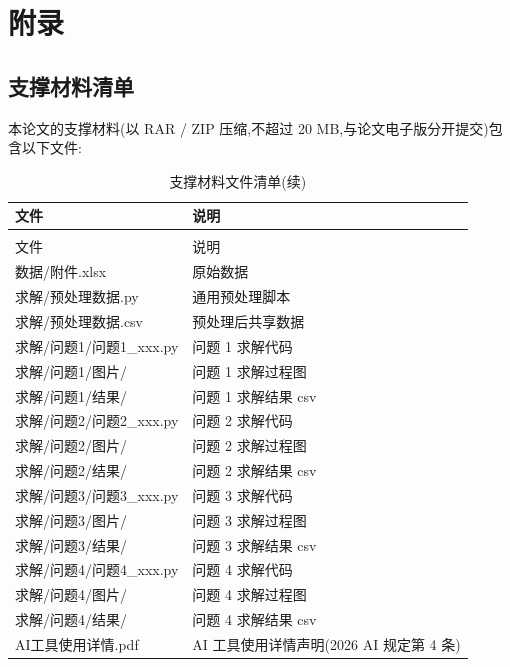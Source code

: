 
\section*{附录}

\subsection*{支撑材料清单}

本论文的支撑材料(以 RAR / ZIP 压缩,不超过 20 MB,与论文电子版分开提交)包含以下文件:

\begin{longtable}{>{\centering\arraybackslash}p{}>{\centering\arraybackslash}p{}}
  \caption{支撑材料文件清单}\\
  \toprule
  文件 & 说明 \\
  \midrule
  \endfirsthead
  \caption{支撑材料文件清单(续)}\\
  \toprule
  文件 & 说明 \\
  \midrule
  \endhead
  \bottomrule
  \endfoot
  数据/附件.xlsx & 原始数据 \\
  求解/预处理数据.py & 通用预处理脚本 \\
  求解/预处理数据.csv & 预处理后共享数据 \\
  求解/问题1/问题1\_xxx.py & 问题 1 求解代码 \\
  求解/问题1/图片/ & 问题 1 求解过程图 \\
  求解/问题1/结果/ & 问题 1 求解结果 csv \\
  求解/问题2/问题2\_xxx.py & 问题 2 求解代码 \\
  求解/问题2/图片/ & 问题 2 求解过程图 \\
  求解/问题2/结果/ & 问题 2 求解结果 csv \\
  求解/问题3/问题3\_xxx.py & 问题 3 求解代码 \\
  求解/问题3/图片/ & 问题 3 求解过程图 \\
  求解/问题3/结果/ & 问题 3 求解结果 csv \\
  求解/问题4/问题4\_xxx.py & 问题 4 求解代码 \\
  求解/问题4/图片/ & 问题 4 求解过程图 \\
  求解/问题4/结果/ & 问题 4 求解结果 csv \\
  AI工具使用详情.pdf & AI 工具使用详情声明(2026 AI 规定第 4 条) \\
\end{longtable}


